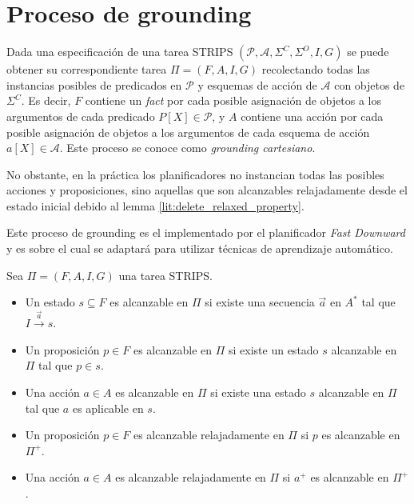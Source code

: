 \section{Proceso de grounding}
\label{lit:relaxed_grounding}

Dada una especificación de una tarea STRIPS $(\mathcal{P}, \mathcal{A},
\Sigma^{C}, \Sigma^{O}, I, G)$ se puede obtener su correspondiente tarea $\Pi =
(F, A, I, G)$ recolectando todas las instancias posibles de predicados en
$\mathcal{P}$ y esquemas de acción de $\mathcal{A}$ con objetos de $\Sigma^{C}$.
Es decir, $F$ contiene un \emph{fact} por cada posible asignación de objetos a
los argumentos de cada predicado $P[X] \in \mathcal{P}$, y $A$ contiene una
acción por cada posible asignación de objetos a los argumentos de cada esquema
de acción $a[X] \in \mathcal{A}$. Este proceso se conoce como \emph{grounding
cartesiano}.

No obstante, en la práctica los planificadores no instancian todas las posibles
acciones y proposiciones, sino aquellas que son alcanzables relajadamente desde
el estado inicial debido al lemma \ref{lit:delete_relaxed_property}. 

Este proceso de grounding es el implementado por el planificador \emph{Fast
Downward} \citep{Helmert-2011} y es sobre el cual se adaptará para utilizar
técnicas de aprendizaje automático.

\begin{mydef}
    Sea $\Pi = (F, A, I, G)$ una tarea STRIPS.    
    \begin{itemize}
        \item Un estado $s \subseteq F$ es alcanzable en $\Pi$ si existe una
        secuencia $\vec{a}$ en $A^{*}$ tal que $I \xrightarrow{\vec{a}} s$.
    
        \item Un proposición $p \in F$ es alcanzable en $\Pi$ si existe un estado
        $s$ alcanzable en $\Pi$ tal que $p \in s$.

        \item Una acción $a \in A$ es alcanzable en $\Pi$ si existe una estado $s$
        alcanzable en $\Pi$ tal que $a$ es aplicable en $s$.

        \item Un proposición $p \in F$ es alcanzable relajadamente en $\Pi$ si
        $p$ es alcanzable en $\Pi^{+}$.

        \item Una acción $a \in A$ es alcanzable relajadamente en $\Pi$ si
        $a^{+}$ es alcanzable en $\Pi^{+}$.
    \end{itemize}
\end{mydef}


